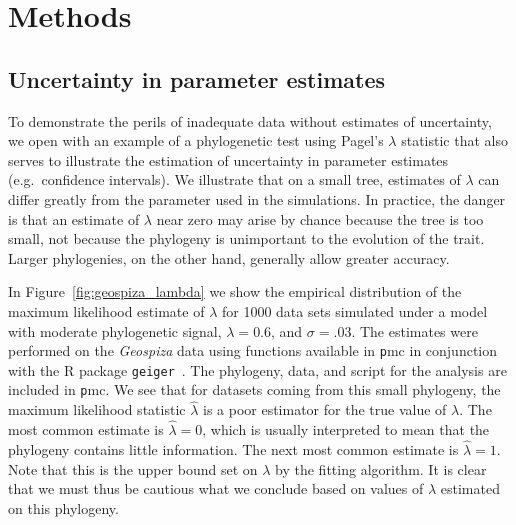 \section{Methods} %

\subsection{Uncertainty in parameter estimates}
To demonstrate the perils of inadequate data without estimates of uncertainty,
we open with an example of a phylogenetic test using Pagel's $\lambda$ statistic
that also serves to illustrate the estimation of uncertainty in parameter estimates
(e.g.\ confidence intervals).
We illustrate that on a small tree,
estimates of $\lambda$ can differ greatly from the parameter used in the simulations.
In practice, the danger is that an estimate of $\lambda$ near zero may arise by chance because the tree is too small,
not because the phylogeny is unimportant to the evolution of the trait. 
Larger phylogenies, on the other hand, generally allow greater accuracy.

In Figure~\ref{fig:geospiza_lambda} we show the empirical distribution
of the maximum likelihood estimate of $\lambda$
for 1000 data sets simulated under 
a model with moderate phylogenetic signal, $\lambda =0.6$,
and $\sigma=.03$.
The estimates were performed on the \emph{Geospiza} data using functions available in {\texttt pmc} in conjunction with the R package \texttt{geiger}~\citep{Harmon2008}.
The phylogeny, data, and script for the analysis are included in {\texttt pmc}.
We see that for datasets coming from this small phylogeny, 
the maximum likelihood statistic $\hat \lambda$
is a poor estimator for the true value of $\lambda$. 
The most common estimate is $\hat \lambda = 0$,
which is usually interpreted to mean that the phylogeny contains little information.  
The next most common estimate is $\hat \lambda = 1$. 
Note that this is the upper bound set on $\lambda$ by the fitting algorithm.
It is clear that 
we must thus be cautious what we conclude based on values of $\lambda$ estimated on this phylogeny.

